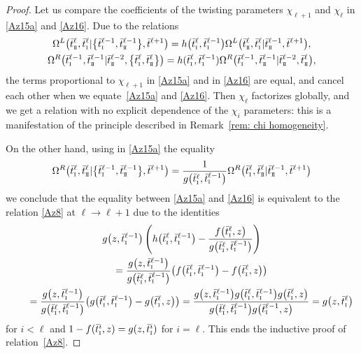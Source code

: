 \documentclass[pdftex]{sigma}
\newcommand{\so}{\scriptscriptstyle \rm I}
\newcommand{\st}{\scriptscriptstyle \rm I\hspace{-1pt}I}
\newcommand{\bt}{{\bar t}}
\theoremstyle{definition}
\def\r#1{\eqref{#1}}
\def\vk{\chi}
\def\Oml{\Omega^L}
\def\Omr{\Omega^R}
\begin{document}
\begin{proof}
Let us compare the coefficients of the twisting parameters $\vk_{\ell+1}$
and $\vk_\ell$ in \r{Az15a} and \r{Az16}.
Due to the relations
\begin{gather*}
\Oml\bigl(\bt^\ell_{\st},\bt^\ell_{\so}|\bigl\{\bt^{\ell-1}_{\so},\bt^{\ell-1}_{\st}\bigr\},\bt^{\ell+1}\bigr)=
h\bigl(\bt^\ell_{\so},\bt^{\ell-1}_{\so}\bigr)
\Oml\bigl(\bt^\ell_{\st},\bt^\ell_{\so}|\bt^{\ell-1}_{\st},\bt^{\ell+1}\bigr),\\
 \Omr\bigl(\bt^{\ell-1}_{\so},\bt^{\ell-1}_{\st}|\bt^{\ell-2}_{\st},\bigl\{\bt^{\ell}_{\so},\bt^\ell_{\st}\bigr\}\bigr)=
h(\bt^\ell_{\so},\bt^{\ell-1}_{\so})
\Omr\bigl(\bt^{\ell-1}_{\so},\bt^{\ell-1}_{\st}|\bt^{\ell-2}_{\st},\bt^{\ell}_{\st}\bigr),
\end{gather*}
the terms proportional to $\vk_{\ell+1}$
in \r{Az15a} and in \r{Az16} are equal, and cancel each other when we equate~\r{Az15a} and \r{Az16}. Then $\chi_\ell$ factorizes globally, and we get a relation with no explicit dependence of the $\chi_i$ parameters:
this is a manifestation of the
principle described in Remark~\ref{rem: chi homogeneity}.


On the other hand, using in \r{Az15a} the equality
\begin{equation*}
\Omr\bigl(\bt^\ell_{\so},\bt^\ell_{\st}|\bigl\{\bt^{\ell-1}_{\so},\bt^{\ell-1}_{\st}\bigr\},\bt^{\ell+1}\bigr)=
\frac{1}{g\bigl(\bt^\ell_{\so},\bt^{\ell-1}_{\so}\bigr)}
\Omr\bigl(\bt^\ell_{\so},\bt^\ell_{\st}|\bt^{\ell-1}_{\st},\bt^{\ell+1}\bigr)
\end{equation*}
we conclude that the equality between \r{Az15a} and \r{Az16} is
equivalent to the relation \r{Az8} at $\ell\to \ell+1$ due to the identities
\begin{gather}
g\bigl(z,\bt^{\ell-1}_{\so}\bigr)\left(h\bigl(\bt^\ell_{\so},\bt^{\ell-1}_{\so}\bigr)-
\frac{f\bigl(\bt^\ell_{\so},z\bigr)}{g\bigl(\bt^\ell_{\so},\bt^{\ell-1}_{\so}\bigr)}\right)\nonumber\\
\qquad=
\frac{g\bigl(z,\bt^{\ell-1}_{\so}\bigr)}
{g\bigl(\bt^\ell_{\so},\bt^{\ell-1}_{\so}\bigr)}\bigl(f\bigl(\bt^\ell_{\so},\bt^{\ell-1}_{\so}\bigr)-
f\bigl(\bt^\ell_{\so},z\bigr)\bigr)\nonumber
\\
\qquad=\frac{g\bigl(z,\bt^{\ell-1}_{\so}\bigr)}
{g\bigl(\bt^\ell_{\so},\bt^{\ell-1}_{\so}\bigr)}\bigl(g\bigl(\bt^\ell_{\so},\bt^{\ell-1}_{\so}\bigr)-
g\bigl(\bt^\ell_{\so},z\bigr)\bigr)=
\frac{g\bigl(z,\bt^{\ell-1}_{\so}\bigr) g\bigl(\bt^\ell_{\so},\bt^{\ell-1}_{\so}\bigr)
g\bigl(\bt^\ell_{\so},z\bigr)}
{g\bigl(\bt^\ell_{\so},\bt^{\ell-1}_{\so}\bigr) g\bigl(\bt^{\ell-1}_{\so},z\bigr)}=
g\bigl(z,\bt^{\ell}_{\so}\bigr)\label{simp}
\end{gather}
 for $i<\ell$ and
$ 1 - f(\bt^{i}_{\so}, z) = g(z, \bt^{i}_{\so})$
for $i=\ell$.
This ends the inductive proof of relation~\eqref{Az8}. \end{proof}
\end{document}
